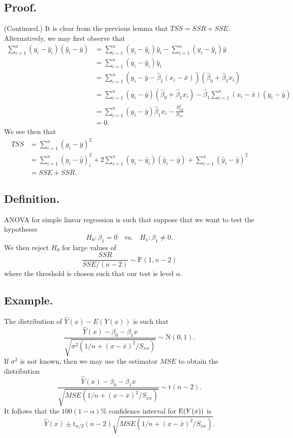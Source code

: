 \documentclass[titlepage]{article}
\begin{document}
\subsection{Proof.} (Continued.) It is clear from the previous lemma that $TSS = SSR + SSE$. Alternatively, we may first observe that 
\begin{align*}
    \sum_{i=1}^{n}(y_{i}-\hat{y}_{i})(\hat{y}_{i}-\bar{y}) &= \sum_{i=1}^{n}(y_{i}-\hat{y}_{i})\hat{y}_{i} - \sum_{i=1}^{n}(y_{i}-\hat{y}_{i})\bar{y} \\
                                                           &= \sum_{i=1}^{n}(y_{i}-\hat{y}_{i})\hat{y}_{i} \\
                                                           &= \sum_{i=1}^{n}(y_{i}-\bar{y}-\hat{\beta}_{1}(x_{i} - \bar{x}))(\hat{\beta}_{0} + \hat{\beta}_{1}x_{i}) \\
                                                           &= \sum_{i=1}^{n}(y_{i}-\bar{y})(\hat{\beta}_{0} + \hat{\beta}_{1}x_{i}) - \hat{\beta}_{1}\sum_{i=1}^{n}(x_{i}-\bar{x})(y_{i}-\bar{y}) \\
                                                           &= \sum_{i=1}^{n}(y_{i}-\bar{y})\hat{\beta}_{1}x_{i} - \frac{S_{xy}^{2}}{S_{xx}} \\
                                                           &= 0.
\end{align*}
We see then that 
\begin{align*}
    TSS &= \sum_{i=1}^{n}(y_{i} - \bar{y})^{2} \\
        &= \sum_{i=1}^{n}(y_{i} - \hat{y})_{i}^{2} + 2\sum_{i=1}^{n}(y_{i} - \hat{y}_{i})(\hat{y}_{i} - \bar{y}) + \sum_{i=1}^{n}(\hat{y}_{i} - \bar{y})^{2} \\
        &= SSE + SSR.
\end{align*}

\subsection{Definition.} ANOVA for simple linear regression is such that suppose that we want to test the hypotheses 
$$H_{0}: \beta_{1} = 0 \quad \text{vs.} \quad H_{1}: \beta_{1} \neq 0.$$
We then reject $H_{0}$ for large values of 
$$\frac{SSR}{SSE/(n-2)} \sim \text{F}(1, n-2)$$
where the threshold is chosen such that our test is level $\alpha$.

\subsection{Example.} The distribution of $\hat{Y}(x) - E(Y(x))$ is such that 
$$\frac{\hat{Y}(x) - \beta_{0} - \beta_{1}x}{\sqrt{\sigma^{2}(1/n + (x-\bar{x})^{2}/S_{xx})}} \sim \text{N}(0, 1).$$
If $\sigma^{2}$ is not known, then we may use the estimator $MSE$ to obtain the distribution 
$$\frac{\hat{Y}(x) - \beta_{0} - \beta_{1}x}{\sqrt{MSE(1/n + (x-\bar{x})^{2}/S_{xx})}} \sim \text{t}(n-2).$$
It follows that the $100(1-\alpha)\%$ confidence interval for $\text{E}(Y(x))$ is
$$\hat{Y}(x) \pm \text{t}_{\alpha/2}(n-2)\sqrt{MSE(1/n + (x-\bar{x})^{2}/S_{xx})}.$$
\end{document}

